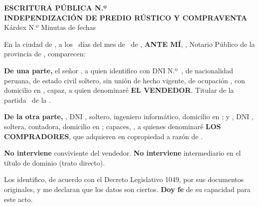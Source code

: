 \documentclass[12pt,a4paper]{article}
\begin{document}



\vspace{0.45em}
\begin{center}
{\large\bfseries\color{tinta}ESCRITURA PÚBLICA N.º \linea[2.6cm]}\\[0.15em]
{\bfseries INDEPENDIZACIÓN DE PREDIO RÚSTICO Y COMPRAVENTA}\\[0.1em]
{\small Kárdex N.º \linea[2.2cm] \quad Minutas de fechas \linea[3.8cm]}
\end{center}

\vspace{0.25em}
\noindent En la ciudad de \NotariaCiudad, a los \DiaOtorgamiento\ días del mes de \MesOtorgamiento\ de \AnioOtorgamiento, \textbf{ANTE MÍ}, \NotarioNombre, Notario Público de la provincia de \Provincia, comparecen:

\vspace{0.3em}
\noindent \textbf{De una parte,} el señor \textbf{\VendedorNombreCompleto}, a quien identifico con DNI N.º\ \VendedorDNI, de nacionalidad peruana, de estado civil soltero, sin unión de hecho vigente, de ocupación \VendedorOcupacion, con domicilio en \VendedorDomicilio, capaz, a quien denominaré \textbf{EL VENDEDOR}. Titular de la partida \PartidaMatriz\ de la \OficinaRegistral.

\vspace{0.2em}
\noindent \textbf{De la otra parte,} \textbf{\CompradorUnoNombre}, DNI \CompradorUnoDNI, soltero, ingeniero informático, domicilio en \CompradorUnoDomicilio; y \textbf{\CompradorDosNombre}, DNI \CompradorDosDNI, soltera, contadora, domicilio en \CompradorDosDomicilio; capaces, \CompradorParentesco, a quienes denominaré \textbf{LOS COMPRADORES}, que adquieren en copropiedad a razón de \PorcentajeCopropiedad.

\vspace{0.2em}
\noindent \textbf{No interviene} conviviente del vendedor. \textbf{No interviene} intermediario en el título de dominio (trato directo).

\vspace{0.2em}
\noindent Los identifico, de acuerdo con el Decreto Legislativo 1049, por sus documentos originales, y me declaran que los datos son ciertos. \textbf{Doy fe} de su capacidad para este acto.
\end{document}
